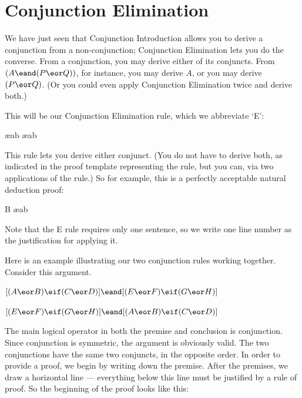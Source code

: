 \section{Conjunction Elimination}

We have just seen that Conjunction Introduction allows you to derive a conjunction from a non-conjunction; Conjunction Elimination lets you do the converse. From a conjunction, you may derive either of its conjuncts. From $(A \eand (P \eor Q))$, for instance, you may derive $A$, or you may derive $(P \eor Q)$. (Or you could even apply Conjunction Elimination twice and derive both.)

This will be our Conjunction Elimination rule, which we abbreviate `{\eand}E':

\begin{ndproof}
	\metaA{} \ae{ab}
	\metaB{} \ae{ab}
\end{ndproof}

This rule lets you derive either conjunct. (You do not have to derive both, as indicated in the proof template representing the rule, but you can, via two applications of the rule.) So for example, this is a perfectly acceptable natural deduction proof:

\begin{ndproof}
	B \ae{ab}
\end{ndproof}

Note that the {\eand}E rule requires only one sentence, so we write one line number as the justification for applying it.

Here is an example illustrating our two conjunction rules working together. Consider this argument.
\begin{earg}
\item[] $[(A\eor B)\eif(C\eor D)] \eand [(E \eor F) \eif (G\eor H)]$
\item[\therefore] $[(E \eor F) \eif (G\eor H)] \eand [(A\eor B)\eif(C\eor D)]$
\end{earg}
The main logical operator in both the premise and conclusion is conjunction. Since conjunction is symmetric, the argument is obviously valid. The two conjunctions have the same two conjuncts, in the opposite order. In order to provide a proof, we begin by writing down the premise. After the premises, we draw a horizontal line --- everything below this line must be justified by a rule of proof. So the beginning of the proof looks like this:

